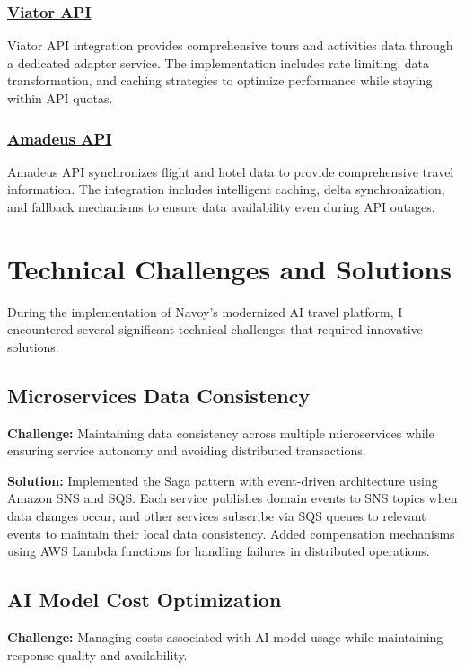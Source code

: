 \subsubsection*{\underline{Viator API}}
Viator API integration provides comprehensive tours and activities data through a dedicated adapter service. The implementation includes rate limiting, data transformation, and caching strategies to optimize performance while staying within API quotas.

\subsubsection*{\underline{Amadeus API}}
Amadeus API synchronizes flight and hotel data to provide comprehensive travel information. The integration includes intelligent caching, delta synchronization, and fallback mechanisms to ensure data availability even during API outages.

\section{Technical Challenges and Solutions}
During the implementation of Navoy's modernized AI travel platform, I encountered several significant technical challenges that required innovative solutions.

\subsection{Microservices Data Consistency}
\textbf{Challenge:} Maintaining data consistency across multiple microservices while ensuring service autonomy and avoiding distributed transactions.

\textbf{Solution:} Implemented the Saga pattern with event-driven architecture using Amazon SNS and SQS. Each service publishes domain events to SNS topics when data changes occur, and other services subscribe via SQS queues to relevant events to maintain their local data consistency. Added compensation mechanisms using AWS Lambda functions for handling failures in distributed operations.

\subsection{AI Model Cost Optimization}
\textbf{Challenge:} Managing costs associated with AI model usage while maintaining response quality and availability.

